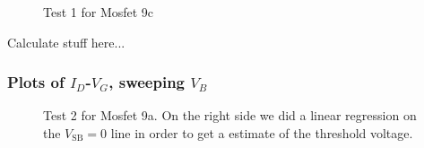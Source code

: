 \documentclass{article}
\begin{document}
\begin{figure}[H]
\centering
{}
\caption{Test 1 for Mosfet 9c}
\end{figure}

Calculate stuff here...

\subsubsection{Plots of $I_D$-$V_G$, sweeping $V_B$}

\begin{figure}[H]
\centering
{}
\caption{Test 2 for Mosfet 9a. On the right side we did a linear regression on the $V_{\text{SB}} = 0$ line in order to get a estimate of the threshold voltage.}
\label{fig:9alin}
\end{figure}
\end{document}
